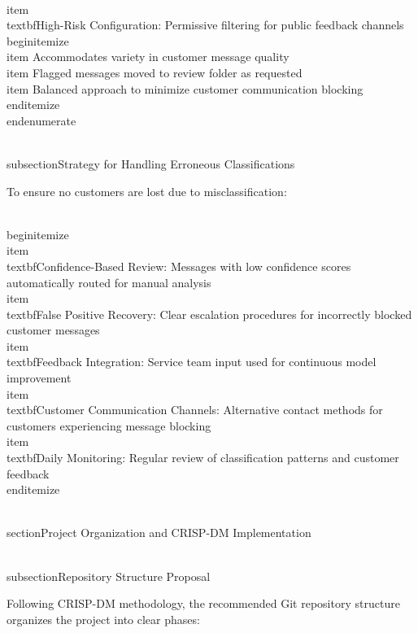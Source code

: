 \documentclass[12pt,a4paper]{article}
\begin{document}
    \\item \\textbf{High-Risk Configuration}: Permissive filtering for public feedback channels
    \\begin{itemize}
        \\item Accommodates variety in customer message quality
        \\item Flagged messages moved to review folder as requested
        \\item Balanced approach to minimize customer communication blocking
    \\end{itemize}
\\end{enumerate}

\\subsection{Strategy for Handling Erroneous Classifications}

To ensure no customers are lost due to misclassification:

\\begin{itemize}
    \\item \\textbf{Confidence-Based Review}: Messages with low confidence scores automatically routed for manual analysis
    \\item \\textbf{False Positive Recovery}: Clear escalation procedures for incorrectly blocked customer messages
    \\item \\textbf{Feedback Integration}: Service team input used for continuous model improvement
    \\item \\textbf{Customer Communication Channels}: Alternative contact methods for customers experiencing message blocking
    \\item \\textbf{Daily Monitoring}: Regular review of classification patterns and customer feedback
\\end{itemize}

\\section{Project Organization and CRISP-DM Implementation}

\\subsection{Repository Structure Proposal}

Following CRISP-DM methodology, the recommended Git repository structure organizes the project into clear phases:
\end{document}
